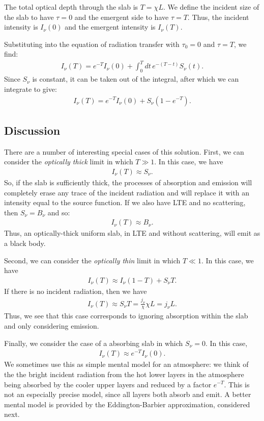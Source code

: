 The total optical depth through the slab is $T=\chi L$. We define the incident size of the slab to have $\tau = 0$ and the emergent side to have $\tau = T$. Thus, the incident intensity is $I_\nu(0)$ and the emergent intensity is $I_\nu(T)$.

Substituting into the equation of radiation transfer with $\tau_0 = 0$ and $\tau = T$, we find:
\begin{align}
I_\nu(T) = e^{-T} I_\nu(0) + \int_{0}^{T}\!\!dt\,e^{-(T-t)}S_\nu(t).
\end{align}
Since $S_\nu$ is constant, it can be taken out of the integral, after which we can integrate to give:
\begin{align}
I_\nu(T) = e^{-T} I_\nu(0) + S_\nu (1-e^{-T}).
\end{align}

\newslide

\subsection{Discussion}

There are a number of interesting special cases of this solution. First, we can consider the \emph{optically thick} limit in which $T\gg1$. In this case, we have
\begin{align}
I_\nu(T) \approx S_\nu.
\end{align}
So, if the slab is sufficiently thick, the processes of absorption and emission will completely erase any trace of the incident radiation and will replace it with an intensity equal to the source function. If we also have LTE and no scattering, then $S_\nu = B_\nu$ and so:
\begin{align}
I_\nu(T) \approx B_\nu.
\end{align}
Thus, an optically-thick uniform slab, in LTE and without scattering, will emit as a black body.

Second, we can consider the \emph{optically thin} limit in which $T\ll1$. In this case, we have
\begin{align}
I_\nu(T) \approx I_\nu (1- T) + S_\nu T.
\end{align}
If there is no incident radiation, then we have
\begin{align}
I_\nu(T) \approx S_\nu T = \frac{j_\nu}{\chi} \chi L = j_\nu L.
\end{align}
Thus, we see that this case corresponds to ignoring absorption within the slab and only considering emission.

Finally, we consider the case of a absorbing slab in which $S_\nu = 0$. In this case, 
\begin{align}
I_\nu(T) \approx e^{-T} I_\nu(0).
\end{align}
We sometimes use this as simple mental model for an atmosphere: we think of the the bright incident radiation from the hot lower layers in the atmosphere being absorbed by the cooler upper layers and reduced by a factor $e^{-T}$. This is not an especially precise model, since all layers both absorb and emit. A better mental model is provided by the Eddington-Barbier approximation, considered next.

